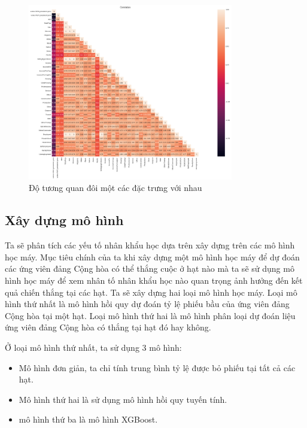 \documentclass[14pt, a4paper]{article}
\numberwithin{equation}{section}
\numberwithin{figure}{section}
\numberwithin{dl}{section}
\numberwithin{md}{section}
\numberwithin{bd}{section}
\numberwithin{dn}{section}
\numberwithin{hq}{section}
\begin{document}
    \begin{figure}[h!]
        \centering
        \includegraphics[width=0.8\textwidth]{figures/Correlation_heatmap.png}
        \caption{Độ tương quan đôi một các đặc trưng với nhau}
    \end{figure}

    \subsection{Xây dựng mô hình}

    Ta sẽ phân tích các yếu tố nhân khẩu học dựa trên xây dựng trên các mô hình học máy.
    Mục tiêu chính của ta khi xây dựng một mô hình học máy để dự đoán các ứng viên đảng Cộng hòa có thể thắng cuộc ở hạt nào mà ta sẽ sử dụng mô hình học máy để xem nhân tố nhân khẩu học nào quan trọng ảnh hưởng đến kết quả chiến thắng tại các hạt.
    Ta sẽ xây dựng hai loại mô hình học máy. 
    Loại mô hình thứ nhất là mô hình hồi quy dự đoán tỷ lệ phiếu bầu của ứng viên đảng Cộng hòa tại một hạt.
    Loại mô hình thứ hai là mô hình phân loại dự đoán liệu ứng viên đảng Cộng hòa có thắng tại hạt đó hay không.

    Ở loại mô hình thứ nhất, ta sử dụng 3 mô hình:

    \begin{itemize}
        \item Mô hình đơn giản, ta chỉ tính trung bình tỷ lệ được bỏ phiếu tại tất cả các hạt.
        \item Mô hình thứ hai là sử dụng mô hình hồi quy tuyến tính.
        \item mô hình thứ ba là mô hình XGBoost.
    \end{itemize}
\end{document}

